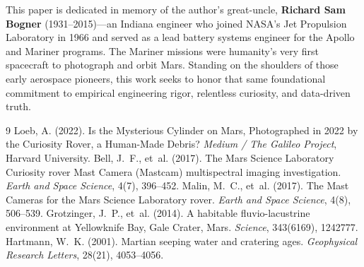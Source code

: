 \documentclass[11pt,a4paper]{article}
\begin{document}
This paper is dedicated in memory of the author's great-uncle, \textbf{Richard Sam Bogner} (1931--2015)---an Indiana engineer who joined NASA's Jet Propulsion Laboratory in 1966 and served as a lead battery systems engineer for the Apollo and Mariner programs. The Mariner missions were humanity's very first spacecraft to photograph and orbit Mars. Standing on the shoulders of those early aerospace pioneers, this work seeks to honor that same foundational commitment to empirical engineering rigor, relentless curiosity, and data-driven truth.

\begin{thebibliography}{9}
 Loeb, A. (2022). Is the Mysterious Cylinder on Mars, Photographed in 2022 by the Curiosity Rover, a Human-Made Debris? \textit{Medium / The Galileo Project}, Harvard University.
 Bell, J.~F., et~al. (2017). The Mars Science Laboratory Curiosity rover Mast Camera (Mastcam) multispectral imaging investigation. \textit{Earth and Space Science}, 4(7), 396--452.
 Malin, M.~C., et~al. (2017). The Mast Cameras for the Mars Science Laboratory rover. \textit{Earth and Space Science}, 4(8), 506--539.
 Grotzinger, J.~P., et~al. (2014). A habitable fluvio-lacustrine environment at Yellowknife Bay, Gale Crater, Mars. \textit{Science}, 343(6169), 1242777.
 Hartmann, W.~K. (2001). Martian seeping water and cratering ages. \textit{Geophysical Research Letters}, 28(21), 4053--4056.
\end{thebibliography}
\end{document}
